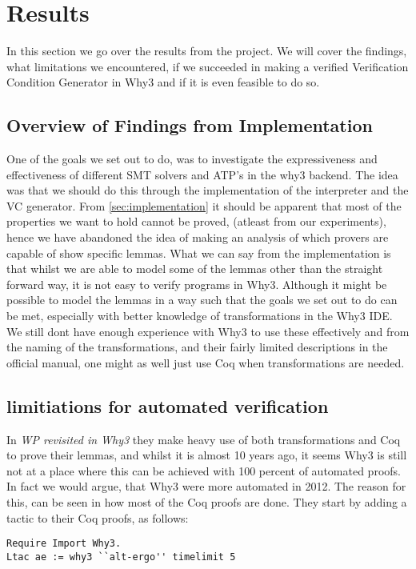 \section{Results}\label{sec:results}
In this section we go over the results from the project.
We will cover the findings,
what limitations we encountered,
if we succeeded in making a verified Verification Condition Generator in Why3 and if it is even feasible to do so.

\subsection{Overview of Findings from Implementation}
One of the goals we set out to do, was to investigate the expressiveness and effectiveness of different SMT solvers and ATP's in the why3 backend.
The idea was that we should do this through the implementation of the interpreter and the VC generator.
From \ref{sec:implementation} it should be apparent that most of the properties we want to hold cannot be proved, (atleast from our experiments),
hence we have abandoned the idea of making an analysis of which provers are capable of show specific lemmas.
What we can say from the implementation is that whilst we are able to model some of the lemmas other than the straight forward way,
it is not easy to verify programs in Why3.
Although it might be possible to model the lemmas in a way such that the goals we set out to do can be met, especially with better knowledge of transformations in the Why3 IDE.
We still dont have enough experience with Why3 to use these effectively and from the naming of the transformations, and their fairly limited descriptions in the official manual, one might as well just use Coq when transformations are needed.

\subsection{limitiations for automated verification}
In \textit{WP revisited in Why3} they make heavy use of both transformations and Coq to prove their lemmas,
and whilst it is almost 10 years ago, it seems Why3 is still not at a place where this can be achieved with 100 percent of automated proofs. In fact we would argue, that Why3 were more automated in 2012. The reason for this, can be seen in how most of the Coq proofs are done.
They start by adding a tactic to their Coq proofs, as follows:

\begin{lstlisting}
Require Import Why3.
Ltac ae := why3 ``alt-ergo'' timelimit 5
\end{lstlisting}

